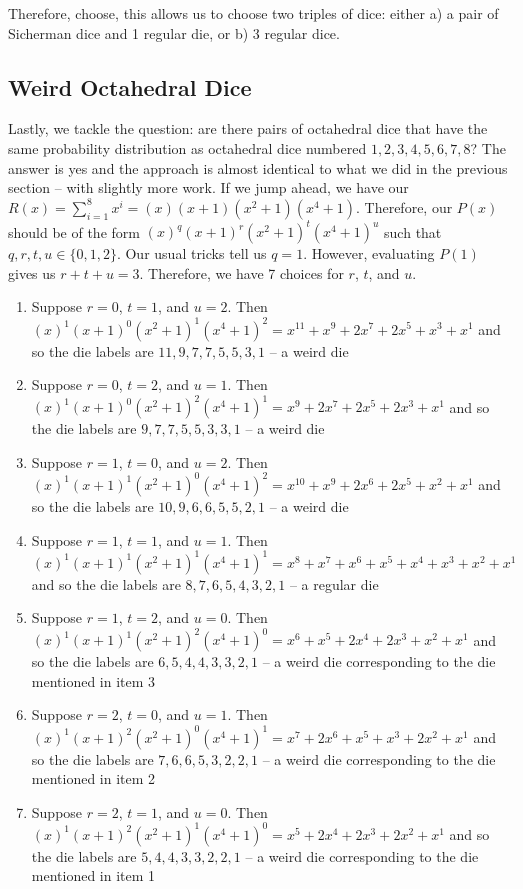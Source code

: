 \documentclass[12pt]{report}
\begin{document}
Therefore, choose, this allows us to choose two triples of dice: either a) a pair of Sicherman dice and 1
regular die, or b) 3 regular dice. 

\subsection*{Weird Octahedral Dice}
Lastly, we tackle the question: are there pairs of octahedral dice that have the same probability distribution
as octahedral dice numbered $1,2,3,4,5,6,7,8$? The answer is yes and the approach is almost identical to what
we did in the previous section -- with slightly more work. If we jump ahead, we have our
$R(x)=\sum_{i=1}^{8} x^{i}=(x)(x+1)(x^{2}+1)(x^{4}+1)$. Therefore, our $P(x)$ should be of the form
$(x)^{q}(x+1)^{r}(x^{2}+1)^{t}(x^{4}+1)^{u}$ such that $q,r,t,u \in \{0,1,2\}$. Our usual tricks tell us
$q=1$. However, evaluating $P(1)$ gives us $r+t+u=3$. Therefore, we have 7 choices for $r$, $t$, and $u$.

\begin{enumerate}
\item Suppose $r=0$, $t=1$, and $u=2$. Then $(x)^{1}(x+1)^{0}(x^{2}+1)^{1}(x^{4}+1)^{2}=x^{11}+x^{9}+2x^{7}+2x^{5}+x^{3}+x^{1}$ and so the die labels are $11,9,7,7,5,5,3,1$ -- a weird die
\item Suppose $r=0$, $t=2$, and $u=1$. Then $(x)^{1}(x+1)^{0}(x^{2}+1)^{2}(x^{4}+1)^{1}=x^{9}+2x^{7}+2x^{5}+2x^{3}+x^{1}$ and so the die labels are $9,7,7,5,5,3,3,1$ -- a weird die
\item Suppose $r=1$, $t=0$, and $u=2$. Then $(x)^{1}(x+1)^{1}(x^{2}+1)^{0}(x^{4}+1)^{2}=x^{10}+x^{9}+2x^{6}+2x^{5}+x^{2}+x^{1}$ and so the die labels are $10,9,6,6,5,5,2,1$ -- a weird die
\item Suppose $r=1$, $t=1$, and $u=1$. Then $(x)^{1}(x+1)^{1}(x^{2}+1)^{1}(x^{4}+1)^{1}=x^{8}+x^{7}+x^{6}+x^{5}+x^{4}+x^{3}+x^{2}+x^{1}$ and so the die labels are $8,7,6,5,4,3,2,1$ -- a regular die 
\item Suppose $r=1$, $t=2$, and $u=0$. Then $(x)^{1}(x+1)^{1}(x^{2}+1)^{2}(x^{4}+1)^{0}=x^{6}+x^{5}+2x^{4}+2x^{3}+x^{2}+x^{1}$ and so the die labels are $6,5,4,4,3,3,2,1$ -- a weird die corresponding to the die mentioned in item 3
\item Suppose $r=2$, $t=0$, and $u=1$. Then $(x)^{1}(x+1)^{2}(x^{2}+1)^{0}(x^{4}+1)^{1}=x^{7}+2x^{6}+x^{5}+x^{3}+2x^{2}+x^{1}$ and so the die labels are $7,6,6,5,3,2,2,1$ -- a weird die corresponding to the die mentioned in item 2
\item Suppose $r=2$, $t=1$, and $u=0$. Then $(x)^{1}(x+1)^{2}(x^{2}+1)^{1}(x^{4}+1)^{0}=x^{5}+2x^{4}+2x^{3}+2x^{2}+x^{1}$ and so the die labels are $5,4,4,3,3,2,2,1$ -- a weird die corresponding to the die mentioned in item 1
\end{enumerate}
\end{document}
